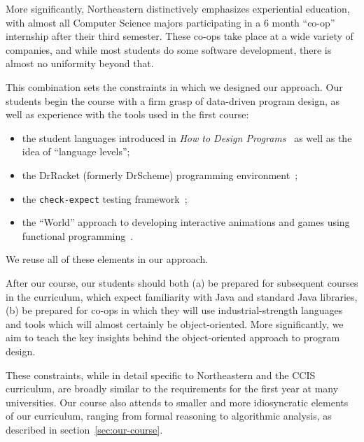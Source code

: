 \documentclass[submission,copyright]{eptcs}
\begin{document}
More significantly, Northeastern distinctively emphasizes experiential
education, with almost all Computer Science majors participating in a
6 month ``co-op'' internship after their third semester.  These co-ops
take place at a wide variety of companies, and while most students do
some software development, there is almost no uniformity beyond that. 

This combination sets the constraints in which we designed our
approach.  Our students begin the course with a firm grasp of
data-driven program design, as well as experience with the tools used
in the first course:

\begin{itemize}
  \item the student languages introduced in \emph{How to Design
    Programs}~\cite{dvanhorn:Felleisen2004Structure,
    dvanhorn:Felleisen2001How} as well as the idea of ``language levels'';

  \item the DrRacket (formerly DrScheme) 
    programming environment~\cite{dvanhorn:Findler2002DrScheme};

  \item the \texttt{check-expect} testing framework~\cite{local:check-expect};

  \item the ``World'' approach to developing interactive animations
    and games using functional
    programming~\cite{dvanhorn:Felleisen2009Functional}.
\end{itemize}

\noindent
We reuse all of these elements in our approach.

After our course, our students should both (a) be prepared for
subsequent courses in the curriculum, which expect familiarity with
Java and standard Java libraries, (b) be prepared for co-ops in which
they will use industrial-strength languages and tools which will
almost certainly be object-oriented.  More significantly, we aim to
teach the key insights behind the object-oriented approach to program
design.

These constraints, while in detail specific to Northeastern and the
CCIS curriculum, are broadly similar to the requirements for the first
year at many universities.  Our course also attends to smaller and
more idiosyncratic elements of our curriculum, ranging from formal
reasoning to algorithmic analysis, as described in
section~\ref{sec:our-course}.
\end{document}
